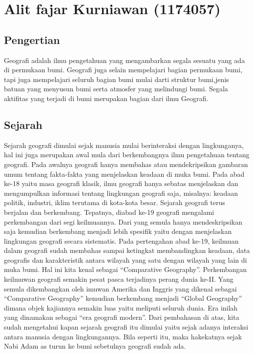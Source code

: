 \section{Alit fajar Kurniawan (1174057)}

\subsection{Pengertian}
Geografi adalah ilmu pengetahuan yang mengambarkan segala sesuatu yang ada di permukaan bumi. \hfill\break
Geografi juga selain mempelajari bagian permukaan bumi, tapi juga mempelajari seluruh bagian bumi mulai darti struktur bumi,jenis batuan yang menyusun bumi serta atmosfer yang melindungi bumi. \hfill\break
Segala aktifitas yang terjadi di bumi merupakan bagian dari ilmu Geografi.\hfill\break
\subsection{Sejarah}
Sejarah geografi dimulai sejak manusia mulai berinteraksi dengan lingkunganya, hal ini juga merupakan awal mula dari berkembangnya ilmu pengetahuan tentang geografi.\hfill\break
Pada awalnya geografi hanya membahas atau mendekripsikan gambaran umum tentang fakta-fakta yang menjelaskan keadaan di muka bumi. Pada abad ke-18 yaitu masa geografi klasik, ilmu geografi hanya sebatas menjelaskan dan mengumpulkan informasi tentang lingkungan geografi saja, misalnya: keadaan politik, industri, iklim terutama di kota-kota besar.\hfill\break
Sejarah geografi terus berjalan dan berkembang. Tepatnya, diabad ke-19 geografi mengalami perkembangan dari segi keilmuannya. Dari yang semula hanya mendeskripsikan saja kemudian berkembang menjadi lebih spesifik yaitu dengan menjelaskan lingkungan geografi secara sistematis.\hfill\break
Pada pertengahan abad ke-19, keilmuan dalam geografi sudah membahas sampai ketingkat membandingkan keadaan, data geografis dan karakteristik antara wilayah yang satu dengan wilayah yang lain di muka bumi. Hal ini kita kenal sebagai “Comparative Geography”.\hfill\break
Perkembangan keilmuwan geografi semakin pesat pasca terjadinya perang dunia ke-II. Yang semula dikembangkan oleh imuwan Amerika dan Inggris yang dikenal sebagai “Comparative Geography” kemudian berkembang menjadi “Global Geography” dimana objek kajiannya semakin luas yaitu meliputi seluruh dunia. Era inilah yang dinamakan sebagai “era geografi modern”.\hfill\break
Dari pembahasan di atas, kita sudah mengetahui kapan sejarah geografi itu dimulai yaitu sejak adanya interaksi antara manusia dengan lingkungannya. Bila seperti itu, maka hakekatnya sejak Nabi Adam as turun ke bumi sebetulnya geografi sudah ada.\hfill\break
